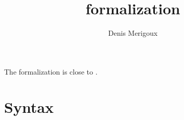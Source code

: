 \documentclass[11pt,a4paper]{article}
\title{\rustspec{} formalization}
\author{Denis Merigoux}
\begin{document}
\maketitle

The formalization is close to \cite{radanne2019kindly}.

\section{Syntax}

\newcommand{\synvar}[1]{\ensuremath{#1}}
\newcommand{\syntext}[1]{\texttt{#1}}
\newcommand{\synkeyword}[1]{\textcolor{red!60!black}{\syntext{#1}}}
\newcommand{\synpunct}[1]{\textcolor{black!40!white}{\texttt{#1}}}

\newcommand{\synuse}{\synkeyword{use}\;}
\newcommand{\synconst}{\synkeyword{const}\;}
\newcommand{\syntypalias}{\synkeyword{type}\;}
\newcommand{\synfn}{\synkeyword{fn}\;}
\newcommand{\synbool}{\synkeyword{bool}}
\newcommand{\synint}{\synkeyword{int}}
\newcommand{\synseq}{\syntext{Seq}}
\newcommand{\syncopy}{\syntext{Copy}}
\newcommand{\synclone}{\syntext{clone()}}
\newcommand{\synlet}{\synkeyword{let}\;}
\newcommand{\synmut}{\synkeyword{mut}}
\newcommand{\synif}{\synkeyword{if}\;}
\newcommand{\synthen}{\;\synkeyword{then}\;}
\newcommand{\synelse}{\;\synkeyword{else}\;}
\newcommand{\synfor}{\synkeyword{for}\;}
\newcommand{\synin}{\;\synkeyword{in}\;}
\newcommand{\syntrue}{\synkeyword{true}}
\newcommand{\synfalse}{\synkeyword{false}}

\newcommand{\synarraymacro}{\synkeyword{array!}}
\newcommand{\synpolymacro}{\synkeyword{poly!}}

\newcommand{\synsc}{\synpunct{;}}
\newcommand{\syntyped}{\;\synpunct{:}\;}
\newcommand{\syneq}{\;\synpunct{=}\;}
\newcommand{\synlparen}{\synpunct{(}\;}
\newcommand{\synrparen}{\;\synpunct{)}}
\newcommand{\syncomma}{\synpunct{,}\;}
\newcommand{\syndot}{\synpunct{.}}
\newcommand{\synref}{\synpunct{\&}}
\newcommand{\synand}{\;\synpunct{\&\&}\;}
\newcommand{\synor}{\;\synpunct{||}\;}
\newcommand{\synxor}{\;\synpunct{\^}\;}
\newcommand{\synadd}{\;\synpunct{+}\;}
\newcommand{\synminus}{\;\synpunct{-}\;}
\newcommand{\synmult}{\;\synpunct{*}\;}
\newcommand{\syndiv}{\;\synpunct{/}\;}
\newcommand{\synnot}{\synpunct{\~}\;}
\newcommand{\synlangle}{\synpunct{<}\;}
\newcommand{\synrangle}{\;\synpunct{>}}
\newcommand{\synlbracket}{\synpunct{\{}\;}
\newcommand{\synrbracket}{\;\synpunct{\}}}
\newcommand{\synarrow}{\;\synpunct{->}\;}
\newcommand{\synrange}{\;\synpunct{..}\;}
\newcommand{\synlsquare}{\synpunct{[}\;}
\newcommand{\synrsquare}{\;\synpunct{]}}
\newcommand{\synellipsis}{\synpunct{,\ldots,}\;}
\end{document}

